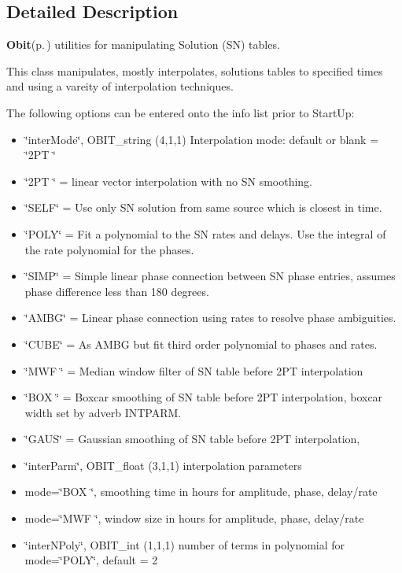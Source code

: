 \subsection{Detailed Description}
{\bf Obit}{\rm (p.\,\pageref{structObit})} utilities for manipulating Solution (SN) tables. 

This class manipulates, mostly interpolates, solutions tables to specified times and using a vareity of interpolation techniques.

The following options can be entered onto the info list prior to Start\-Up: \begin{itemize}
\item \char`\"{}inter\-Mode\char`\"{}, OBIT\_\-string (4,1,1) Interpolation mode: default or blank = \char`\"{}2PT \char`\"{} \item \char`\"{}2PT \char`\"{} = linear vector interpolation with no SN smoothing. \item \char`\"{}SELF\char`\"{} = Use only SN solution from same source which is closest in time. \item \char`\"{}POLY\char`\"{} = Fit a polynomial to the SN rates and delays. Use the integral of the rate polynomial for the phases. \item \char`\"{}SIMP\char`\"{} = Simple linear phase connection between SN phase entries, assumes phase difference less than 180 degrees. \item \char`\"{}AMBG\char`\"{} = Linear phase connection using rates to resolve phase ambiguities. \item \char`\"{}CUBE\char`\"{} = As AMBG but fit third order polynomial to phases and rates. \item \char`\"{}MWF \char`\"{} = Median window filter of SN table before 2PT interpolation \item \char`\"{}BOX \char`\"{} = Boxcar smoothing of SN table before 2PT interpolation, boxcar width set by adverb INTPARM. \item \char`\"{}GAUS\char`\"{} = Gaussian smoothing of SN table before 2PT interpolation, \item \char`\"{}inter\-Parm\char`\"{}, OBIT\_\-float (3,1,1) interpolation parameters \item mode=\char`\"{}BOX \char`\"{}, smoothing time in hours for amplitude, phase, delay/rate \item mode=\char`\"{}MWF \char`\"{}, window size in hours for amplitude, phase, delay/rate\end{itemize}
\begin{itemize}
\item \char`\"{}inter\-NPoly\char`\"{}, OBIT\_\-int (1,1,1) number of terms in polynomial for mode=\char`\"{}POLY\char`\"{}, default = 2\end{itemize}
